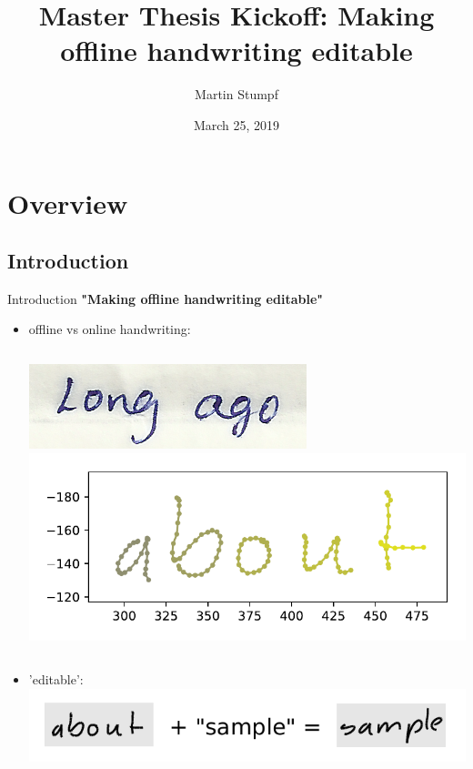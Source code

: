 \documentclass[aspectratio=169]{beamer}
\title{Master Thesis Kickoff: Making offline handwriting editable}
\institute{Pattern Recognition Lab (CS~5)}
\date{March 25, 2019}
\author{Martin Stumpf}
\begin{document}
\maketitle
  
\begin{frame}
  \tableofcontents
\end{frame}

\section{Overview}
\subsection{Introduction}

\begin{frame}{Introduction}
\textbf{"Making offline handwriting editable"}

\begin{itemize}
\item offline vs online handwriting:\\
\begin{columns}
\includegraphics[scale=2.0]{pics/12th-std1-crop.png}
\includegraphics[scale=0.4]{pics/PenPositionsImages.pdf}
\end{columns}\vspace{5pt}
\item 'editable':\\
\includegraphics[scale=1.0]{pics/editable_explanation.pdf}
\end{itemize}
\end{frame}
\end{document}
